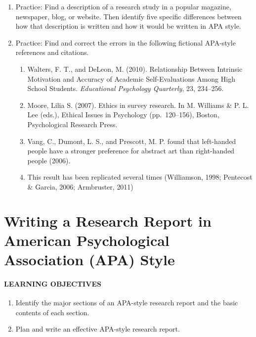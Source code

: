 \documentclass[
]{krantz}
\providecommand{\tightlist}{%
  \setlength{\itemsep}{0pt}\setlength{\parskip}{0pt}}
\begin{document}
\begin{enumerate}
\def\labelenumi{\arabic{enumi}.}
\tightlist
\item
  Practice: Find a description of a research study in a popular magazine, newspaper, blog, or website. Then identify five specific differences between how that description is written and how it would be written in APA style.
\item
  Practice: Find and correct the errors in the following fictional APA-style references and citations.

  \begin{enumerate}
  \def\labelenumii{\alph{enumii}.}
  \tightlist
  \item
    Walters, F. T., and DeLeon, M. (2010). Relationship Between Intrinsic Motivation and Accuracy of Academic Self-Evaluations Among High School Students. \emph{Educational Psychology Quarterly}, 23, 234--256.
  \item
    Moore, Lilia S. (2007). Ethics in survey research. In M. Williams \& P. L. Lee (eds.), Ethical Issues in Psychology (pp.~120--156), Boston, Psychological Research Press.
  \item
    Vang, C., Dumont, L. S., and Prescott, M. P. found that left-handed people have a stronger preference for abstract art than right-handed people (2006).
  \item
    This result has been replicated several times (Williamson, 1998; Pentecost \& Garcia, 2006; Armbruster, 2011)
  \end{enumerate}
\end{enumerate}

\section{Writing a Research Report in American Psychological Association (APA) Style}\label{writing-a-research-report-in-american-psychological-association-apa-style}

\paragraph*{LEARNING OBJECTIVES}\label{learning-objectives-31}

\begin{enumerate}
\def\labelenumi{\arabic{enumi}.}
\tightlist
\item
  Identify the major sections of an APA-style research report and the basic contents of each section.
\item
  Plan and write an effective APA-style research report.
\end{enumerate}
\end{document}
